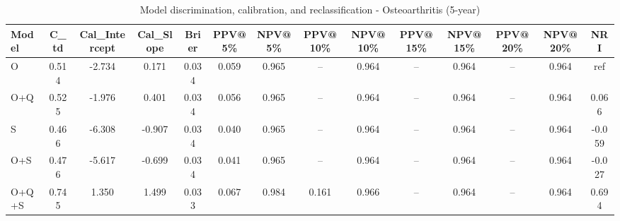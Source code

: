 \begin{table}[htbp]
\centering
\small
\caption{Model discrimination, calibration, and reclassification - Osteoarthritis (5-year)}
\label{tab:perf_osteoarthritis_5y}
\begin{tabular}{lccccccccccccc}
\toprule
Model & C\_td & Cal\_Intercept & Cal\_Slope & Brier & PPV@5\% & NPV@5\% & PPV@10\% & NPV@10\% & PPV@15\% & NPV@15\% & PPV@20\% & NPV@20\% & NRI \\
\midrule
O & 0.514 & -2.734 & 0.171 & 0.034 & 0.059 & 0.965 & -- & 0.964 & -- & 0.964 & -- & 0.964 & ref \\
O+Q & 0.525 & -1.976 & 0.401 & 0.034 & 0.056 & 0.965 & -- & 0.964 & -- & 0.964 & -- & 0.964 & 0.066 \\
S & 0.466 & -6.308 & -0.907 & 0.034 & 0.040 & 0.965 & -- & 0.964 & -- & 0.964 & -- & 0.964 & -0.059 \\
O+S & 0.476 & -5.617 & -0.699 & 0.034 & 0.041 & 0.965 & -- & 0.964 & -- & 0.964 & -- & 0.964 & -0.027 \\
O+Q+S & 0.745 & 1.350 & 1.499 & 0.033 & 0.067 & 0.984 & 0.161 & 0.966 & -- & 0.964 & -- & 0.964 & 0.694 \\
\bottomrule
\end{tabular}
\end{table}
